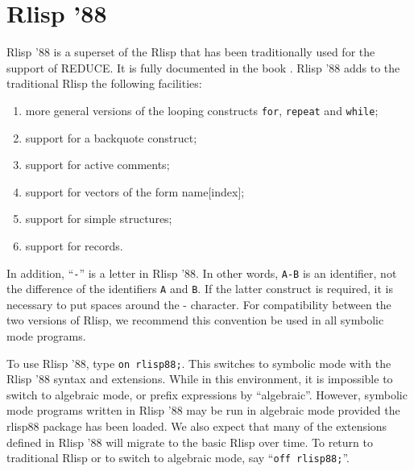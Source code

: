 \section{Rlisp '88}

Rlisp '88 is a superset of the Rlisp that has been traditionally used for
the support of REDUCE.  It is fully documented in the book \cite{Marti:1993}.
Rlisp '88 adds to the traditional Rlisp the following facilities:
\begin{enumerate}
\item more general versions of the looping constructs \texttt{for},
\texttt{repeat} and \texttt{while};

\item support for a backquote construct;

\item support for active comments;

\item support for vectors of the form name[index];

\item support for simple structures;

\item support for records.
\end{enumerate}

In addition, ``\texttt{-}'' is a letter in Rlisp '88.  In other words, \texttt{A-B} is an
identifier, not the difference of the identifiers \texttt{A} and \texttt{B}.  If
the latter construct is required, it is necessary to put spaces around the
- character.  For compatibility between the two versions of Rlisp, we
recommend this convention be used in all symbolic mode programs.

\hypertarget{switch:RLISP88}{}
To use Rlisp '88, type \texttt{on rlisp88;}.  This switches to
symbolic mode with the Rlisp '88 syntax and extensions.  While in this
environment, it is impossible to switch to algebraic mode, or prefix
expressions by ``algebraic''.  However, symbolic mode programs written in
Rlisp '88 may be run in algebraic mode provided the rlisp88 package has been
loaded.  We also expect that many of the extensions defined in Rlisp '88
will migrate to the basic Rlisp over time.  To return to traditional Rlisp
or to switch to algebraic mode, say ``\texttt{off rlisp88;}''.

